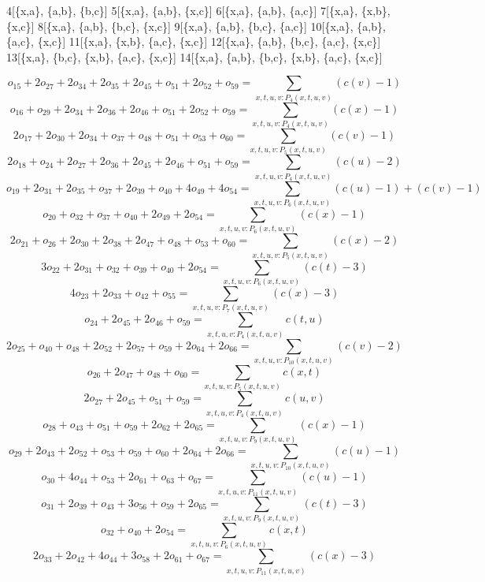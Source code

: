 4[\{x,a\}, \{a,b\}, \{b,c\}]
5[\{x,a\}, \{a,b\}, \{x,c\}]
6[\{x,a\}, \{a,b\}, \{a,c\}]
7[\{x,a\}, \{x,b\}, \{x,c\}]
8[\{x,a\}, \{a,b\}, \{b,c\}, \{x,c\}]
9[\{x,a\}, \{a,b\}, \{b,c\}, \{a,c\}]
10[\{x,a\}, \{a,b\}, \{a,c\}, \{x,c\}]
11[\{x,a\}, \{x,b\}, \{a,c\}, \{x,c\}]
12[\{x,a\}, \{a,b\}, \{b,c\}, \{a,c\}, \{x,c\}]
13[\{x,a\}, \{b,c\}, \{x,b\}, \{a,c\}, \{x,c\}]
14[\{x,a\}, \{a,b\}, \{b,c\}, \{x,b\}, \{a,c\}, \{x,c\}]

\[o_{15} + 2o_{27} + 2o_{34} + 2o_{35} + 2o_{45} + o_{51} + 2o_{52} + o_{59} = \sum\limits_{x,t,u,v:P_{4} (x,t,u,v)} ( c( v ) - 1 ) \]
\[o_{16} + o_{29} + 2o_{34} + 2o_{36} + 2o_{46} + o_{51} + 2o_{52} + o_{59} = \sum\limits_{x,t,u,v:P_{4} (x,t,u,v)} ( c( x ) - 1 ) \]
\[2o_{17} + 2o_{30} + 2o_{34} + o_{37} + o_{48} + o_{51} + o_{53} + o_{60} = \sum\limits_{x,t,u,v:P_{5} (x,t,u,v)} ( c( v ) - 1 ) \]
\[2o_{18} + o_{24} + 2o_{27} + 2o_{36} + 2o_{45} + 2o_{46} + o_{51} + o_{59} = \sum\limits_{x,t,u,v:P_{4} (x,t,u,v)} ( c( u ) - 2 ) \]
\[o_{19} + 2o_{31} + 2o_{35} + o_{37} + 2o_{39} + o_{40} + 4o_{49} + 4o_{54} = \sum\limits_{x,t,u,v:P_{6} (x,t,u,v)} ( c( u ) - 1 ) + ( c( v ) - 1 ) \]
\[o_{20} + o_{32} + o_{37} + o_{40} + 2o_{49} + 2o_{54} = \sum\limits_{x,t,u,v:P_{6} (x,t,u,v)} ( c( x ) - 1 ) \]
\[2o_{21} + o_{26} + 2o_{30} + 2o_{38} + 2o_{47} + o_{48} + o_{53} + o_{60} = \sum\limits_{x,t,u,v:P_{5} (x,t,u,v)} ( c( x ) - 2 ) \]
\[3o_{22} + 2o_{31} + o_{32} + o_{39} + o_{40} + 2o_{54} = \sum\limits_{x,t,u,v:P_{6} (x,t,u,v)} ( c( t ) - 3 ) \]
\[4o_{23} + 2o_{33} + o_{42} + o_{55} = \sum\limits_{x,t,u,v:P_{7} (x,t,u,v)} ( c( x ) - 3 ) \]
\[o_{24} + 2o_{45} + 2o_{46} + o_{59} = \sum\limits_{x,t,u,v:P_{4} (x,t,u,v)} c( t, u ) \]
\[2o_{25} + o_{40} + o_{48} + 2o_{52} + 2o_{57} + o_{59} + 2o_{64} + 2o_{66} = \sum\limits_{x,t,u,v:P_{10} (x,t,u,v)} ( c( v ) - 2 ) \]
\[o_{26} + 2o_{47} + o_{48} + o_{60} = \sum\limits_{x,t,u,v:P_{5} (x,t,u,v)} c( x, t ) \]
\[2o_{27} + 2o_{45} + o_{51} + o_{59} = \sum\limits_{x,t,u,v:P_{4} (x,t,u,v)} c( u, v ) \]
\[o_{28} + o_{43} + o_{51} + o_{59} + 2o_{62} + 2o_{65} = \sum\limits_{x,t,u,v:P_{9} (x,t,u,v)} ( c( x ) - 1 ) \]
\[o_{29} + 2o_{43} + 2o_{52} + o_{53} + o_{59} + o_{60} + 2o_{64} + 2o_{66} = \sum\limits_{x,t,u,v:P_{10} (x,t,u,v)} ( c( u ) - 1 ) \]
\[o_{30} + 4o_{44} + o_{53} + 2o_{61} + o_{63} + o_{67} = \sum\limits_{x,t,u,v:P_{11} (x,t,u,v)} ( c( u ) - 1 ) \]
\[o_{31} + 2o_{39} + o_{43} + 3o_{56} + o_{59} + 2o_{65} = \sum\limits_{x,t,u,v:P_{9} (x,t,u,v)} ( c( t ) - 3 ) \]
\[o_{32} + o_{40} + 2o_{54} = \sum\limits_{x,t,u,v:P_{6} (x,t,u,v)} c( x, t ) \]
\[2o_{33} + 2o_{42} + 4o_{44} + 3o_{58} + 2o_{61} + o_{67} = \sum\limits_{x,t,u,v:P_{11} (x,t,u,v)} ( c( x ) - 3 ) \]
